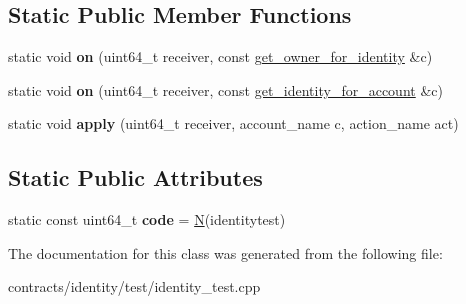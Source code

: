 \subsection*{Static Public Member Functions}
\begin{DoxyCompactItemize}
\item 
\mbox{\label{classidentity__test_1_1contract_ac39a492495f15cc2576adfe8e31107f5}} 
static void {\bfseries on} (uint64\+\_\+t receiver, const \mbox{\hyperlink{structidentity__test_1_1contract_1_1get__owner__for__identity}{get\+\_\+owner\+\_\+for\+\_\+identity}} \&c)
\item 
\mbox{\label{classidentity__test_1_1contract_a5fe2ce0844889c8bdc43668890a9fb58}} 
static void {\bfseries on} (uint64\+\_\+t receiver, const \mbox{\hyperlink{structidentity__test_1_1contract_1_1get__identity__for__account}{get\+\_\+identity\+\_\+for\+\_\+account}} \&c)
\item 
\mbox{\label{classidentity__test_1_1contract_a78bfb23dc87bfb19cb6a28f39fd7f40d}} 
static void {\bfseries apply} (uint64\+\_\+t receiver, account\+\_\+name c, action\+\_\+name act)
\end{DoxyCompactItemize}
\subsection*{Static Public Attributes}
\begin{DoxyCompactItemize}
\item 
\mbox{\label{classidentity__test_1_1contract_a329bf323b03ac3b91dda8da756577ae1}} 
static const uint64\+\_\+t {\bfseries code} = \mbox{\hyperlink{group__types_gaf9c1edb0e0da55ec6ba09f32f6839529}{N}}(identitytest)
\end{DoxyCompactItemize}


The documentation for this class was generated from the following file\+:\begin{DoxyCompactItemize}
\item 
contracts/identity/test/identity\+\_\+test.\+cpp\end{DoxyCompactItemize}
